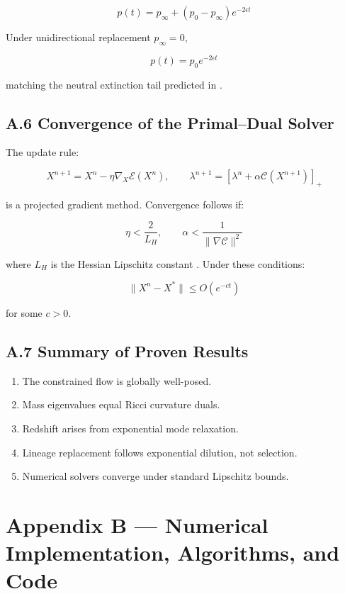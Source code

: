 \documentclass[11pt,a4paper]{article}
\begin{document}
\[
p(t) = p_\infty + (p_0 - p_\infty)e^{-2\epsilon t}
\]

Under unidirectional replacement \(p_\infty=0\),

\[
\boxed{p(t) = p_0 e^{-2\epsilon t}}
\]

matching the neutral extinction tail predicted in \citet{Amadei2025}.

\subsection{A.6 Convergence of the Primal–Dual Solver}

The update rule:

\[
X^{n+1} = X^n - \eta \nabla_X \mathcal{E}(X^n), \qquad
\lambda^{n+1} = [\lambda^n + \alpha \mathcal{C}(X^{n+1})]_+
\]

is a projected gradient method. Convergence follows if:

\[
\eta < \frac{2}{L_H}, \qquad \alpha < \frac{1}{\|\nabla \mathcal{C}\|^2}
\]

where \(L_H\) is the Hessian Lipschitz constant \citep{Boyd2004}. Under these conditions:

\[
\|X^n - X^\ast\| \le O(e^{-ct})
\]

for some \(c>0\).

\subsection{A.7 Summary of Proven Results}

\begin{enumerate}
    \item The constrained flow is globally well-posed.
    \item Mass eigenvalues equal Ricci curvature duals.
    \item Redshift arises from exponential mode relaxation.
    \item Lineage replacement follows exponential dilution, not selection.
    \item Numerical solvers converge under standard Lipschitz bounds.
\end{enumerate}

\clearpage
\section{Appendix B — Numerical Implementation, Algorithms, and Code}
\end{document}

